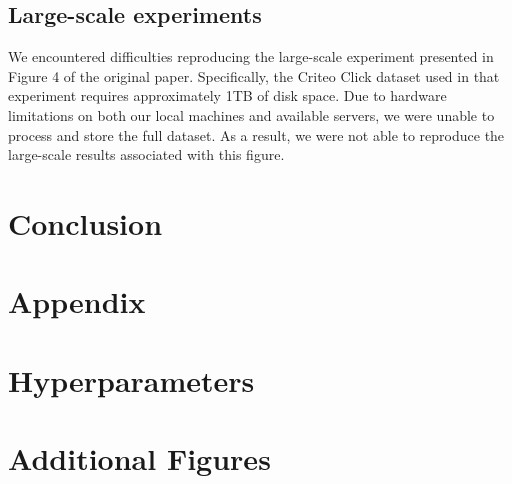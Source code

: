 \documentclass[a4paper,twocolumn]{article} %
\begin{document}
\subsection{ Large-scale experiments}
We encountered difficulties reproducing the large-scale experiment presented in Figure 4 of the original paper. Specifically, the Criteo Click dataset used in that experiment requires approximately 1TB of disk space. 
Due to hardware limitations on both our local machines and available servers, we were unable to process and store the full dataset. 
As a result, we were not able to reproduce the large-scale results associated with this figure.

\section{Conclusion}





\clearpage
\appendix
\section*{Appendix}
\section{Hyperparameters}

\section{Additional Figures}
\end{document}
